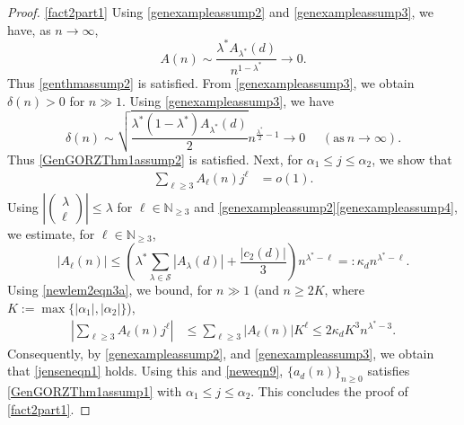 \documentclass[11pt,reqno,a4paper]{amsart}
\renewcommand{\a}{\alpha}
\renewcommand{\d}{{\delta}}
\renewcommand{\l}{\lambda}
\renewcommand{\k}{\kappa}
\renewcommand{\(}{\left\(}
\renewcommand{\)}{\right\)}
\numberwithin{equation}{section}
\theoremstyle{plain}
\theoremstyle{definition} %
\numberwithin{equation}{section}
\newcommand{\smallbinom}[2]{(\begin{smallmatrix}#1\\#2\end{smallmatrix})}
\begin{document}
\begin{proof}
\noindent \ref{fact2part1} Using \ref{genexampleassump2} and \ref{genexampleassump3}, we have, as $n\to \infty$,  
\begin{equation}\label{obs4}
A(n)\sim \frac{\l^*A_{\l^*}(d)}{n^{1-\l^*}}\to 0.
\end{equation}
Thus \ref{genthmassump2} is satisfied. From \ref{genexampleassump3}, we obtain $\d(n)>0$ for $n\!\gg\!1$. Using \ref{genexampleassump3}, we have 
\begin{equation}\label{impfact}
\d(n)\sim \sqrt{\frac{\l^*(1-\l^*)A_{\l^*}(d)}{2}}n^{\frac{\l^*}{2}-1}\to 0\ \ \ \ \ \ (\text{as}\ n\to \infty). %
\end{equation}
 Thus \ref{GenGORZThm1assump2} is satisfied. Next, for  $\a_1\le j\le \a_2$, we show that
\begin{align}%
\label{jenseneqn1}
\sum_{\ell\ge 3}A_{\ell}(n)j^\ell&=o\left(1\right).%
\end{align}
Using $|\smallbinom{\l}{\ell}|\le \l$ for $\ell\in \mathbb{N}_{\ge 3}$ and \ref{genexampleassump2}\textendash\ref{genexampleassump4}, we estimate, for $\ell\in\mathbb{N}_{\ge 3}$, 
\begin{equation}\label{newlem2eqn3a}
|A_{\ell}(n)| \le \left(\l^*\sum_{\l\in \mathcal{S}} |A_{\l}(d)|+\frac{\left|c_2(d)\right|}{3}\right)n^{\l^*-\ell}=:\k_d n^{\l^*-\ell}.
\end{equation}
 Using \eqref{newlem2eqn3a}, we bound, for $n\!\gg\!1$ (and $n\ge 2K$, where $K:=\max\{|\a_1|, |\a_2|\}$), 
\begin{align*}
\left|\sum_{\ell\ge 3}A_{\ell}(n)j^\ell\right|&\le \sum_{\ell\ge 3}\left|A_{\ell}(n)\right|K^\ell
\le 2\k_{d}K^{3}n^{\l^*-3}.
\end{align*}
 Consequently, by \ref{genexampleassump2}, and \ref{genexampleassump3}, we obtain that \eqref{jenseneqn1} holds. Using this and \eqref{neweqn9}, $\{a_d(n)\}_{n\ge 0}$ satisfies \ref{GenGORZThm1assump1} with $\a_1\le j\le \a_2$. This concludes the proof of \ref{fact2part1}. 


\end{proof}
\end{document}
